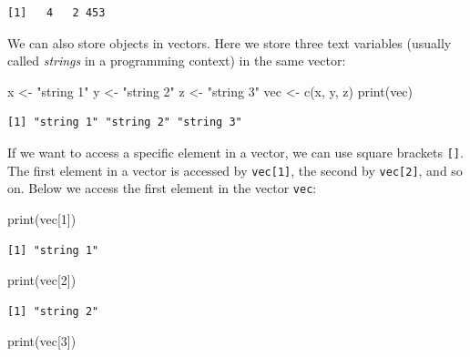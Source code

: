 \documentclass[
  letterpaper,
  DIV=11,
  numbers=noendperiod]{scrreprt}
\newenvironment{Shaded}{\begin{snugshade}}{\end{snugshade}}
\newcommand{\DecValTok}[1]{\textcolor[rgb]{0.68,0.00,0.00}{#1}}
\newcommand{\FunctionTok}[1]{\textcolor[rgb]{0.28,0.35,0.67}{#1}}
\newcommand{\NormalTok}[1]{\textcolor[rgb]{0.00,0.23,0.31}{#1}}
\newcommand{\OtherTok}[1]{\textcolor[rgb]{0.00,0.23,0.31}{#1}}
\newcommand{\StringTok}[1]{\textcolor[rgb]{0.13,0.47,0.30}{#1}}
\begin{document}
\begin{verbatim}
[1]   4   2 453
\end{verbatim}

We can also store objects in vectors. Here we store three text variables
(usually called \emph{strings} in a programming context) in the same
vector:

\begin{Shaded}
\begin{Highlighting}[]
\NormalTok{x }\OtherTok{\textless{}{-}} \StringTok{"string 1"}
\NormalTok{y }\OtherTok{\textless{}{-}} \StringTok{"string 2"}
\NormalTok{z }\OtherTok{\textless{}{-}} \StringTok{"string 3"}
\NormalTok{vec }\OtherTok{\textless{}{-}} \FunctionTok{c}\NormalTok{(x, y, z)}
\FunctionTok{print}\NormalTok{(vec)}
\end{Highlighting}
\end{Shaded}

\begin{verbatim}
[1] "string 1" "string 2" "string 3"
\end{verbatim}

If we want to access a specific element in a vector, we can use square
brackets \texttt{{[}{]}}. The first element in a vector is accessed by
\texttt{vec{[}1{]}}, the second by \texttt{vec{[}2{]}}, and so on. Below
we access the first element in the vector \texttt{vec}:

\begin{Shaded}
\begin{Highlighting}[]
\FunctionTok{print}\NormalTok{(vec[}\DecValTok{1}\NormalTok{])}
\end{Highlighting}
\end{Shaded}

\begin{verbatim}
[1] "string 1"
\end{verbatim}

\begin{Shaded}
\begin{Highlighting}[]
\FunctionTok{print}\NormalTok{(vec[}\DecValTok{2}\NormalTok{])}
\end{Highlighting}
\end{Shaded}

\begin{verbatim}
[1] "string 2"
\end{verbatim}

\begin{Shaded}
\begin{Highlighting}[]
\FunctionTok{print}\NormalTok{(vec[}\DecValTok{3}\NormalTok{])}
\end{Highlighting}
\end{Shaded}
\end{document}
